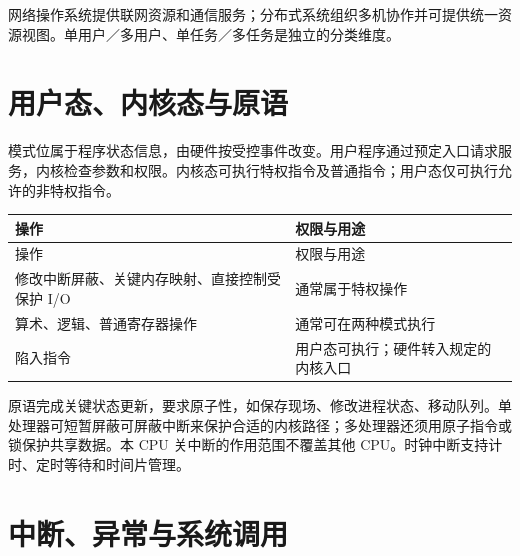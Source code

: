 网络操作系统提供联网资源和通信服务；分布式系统组织多机协作并可提供统一资源视图。单用户／多用户、单任务／多任务是独立的分类维度。

\section{用户态、内核态与原语}\label{OS01-privilege}

模式位属于程序状态信息，由硬件按受控事件改变。用户程序通过预定入口请求服务，内核检查参数和权限。内核态可执行特权指令及普通指令；用户态仅可执行允许的非特权指令。

\par\smallskip
\begin{wideblock}
{\fontsize{9.3}{12}\selectfont\setlength{\tabcolsep}{2.5pt}\setlength{\LTleft}{0pt}\setlength{\LTright}{0pt}
\begin{longtable}{@{}>{\raggedright\arraybackslash}p{}>{\raggedright\arraybackslash}p{}@{}}
\toprule
操作 & 权限与用途 \\

\midrule\endfirsthead\toprule
操作 & 权限与用途 \\

\midrule\endhead\bottomrule\endfoot
修改中断屏蔽、关键内存映射、直接控制受保护 I/O & 通常属于特权操作 \\

算术、逻辑、普通寄存器操作 & 通常可在两种模式执行 \\

陷入指令 & 用户态可执行；硬件转入规定的内核入口 \\

\end{longtable}}
\end{wideblock}
\par\smallskip

原语完成关键状态更新，要求原子性，如保存现场、修改进程状态、移动队列。单处理器可短暂屏蔽可屏蔽中断来保护合适的内核路径；多处理器还须用原子指令或锁保护共享数据。本 CPU 关中断的作用范围不覆盖其他 CPU。时钟中断支持计时、定时等待和时间片管理。

\section{中断、异常与系统调用}\label{OS01-interrupts}

